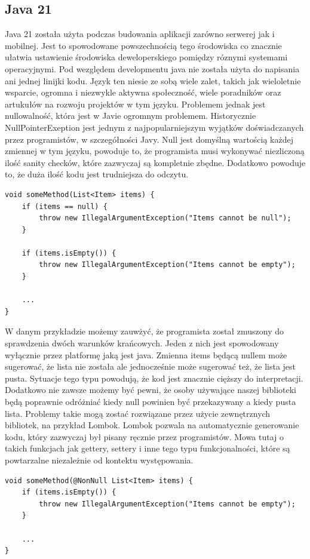 \subsection{Java 21}\label{subsec:uzyte-technologie-java}
Java 21 została użyta podczas budowania aplikacji zarówno serwerej jak i mobilnej.
Jest to spowodowane powszechnością tego środowiska co znacznie ułatwia ustawienie środowiska deweloperskiego pomiędzy róznymi systemami operacyjnymi.
Pod wezględem developmentu java nie została użyta do napisania ani jednej linijki kodu.
Język ten niesie ze sobą wiele zalet, takich jak wieloletnie wsparcie, ogromna i niezwykle aktywna społeczność, wiele poradników oraz artukułów na rozwoju projektów w tym języku.
Problemem jednak jest nullowalność, która jest w Javie ogromnym problemem.
Historycznie NullPointerExeption jest jednym z najpopularniejszym wyjątków doświadczanych przez programistów, w szczegółności Javy.
Null jest domyślną wartością każdej zmiennej w tym języku, powoduje to, że programista musi wykonywać niezliczoną ilość sanity checków, które zazwyczaj są kompletnie zbędne.
Dodatkowo powoduje to, że duża ilość kodu jest trudniejsza do odczytu.
\begin{lstlisting}[caption=Przykład obsługi null (Java)]
void someMethod(List<Item> items) {
    if (items == null) {
        throw new IllegalArgumentException("Items cannot be null");
    }

    if (items.isEmpty()) {
        throw new IllegalArgumentException("Items cannot be empty");
    }

    ...
}
\end{lstlisting}
W danym przykładzie możemy  zauwżyć, że programista został zmuszony do sprawdzenia dwóch warunków krańcowych.
Jeden z nich jest spowodowany wyłącznie przez platformę jaką jest java.
Zmienna items będącą nullem może sugerować, że lista nie została ale jednocześnie może sugerować też, że lista jest pusta.
Sytuacje tego typu powodują, że kod jest znacznie cięższy do interpretacji.
Dodatkowo nie zawsze możemy być pewni, że osoby używające naszej biblioteki będą poprawnie odróżniać kiedy null powinien być przekazywany a kiedy pusta lista.
Problemy takie mogą zostać rozwiązane przez użycie zewnętrznych bibliotek, na przykład Lombok.
Lombok pozwala na automatycznie generowanie kodu, który zazwyczaj był pisany ręcznie przez programistów.
Mowa tutaj o takich funkcjach jak gettery, settery i inne tego typu funkcjonalności, które są powtarzalne niezależnie od kontektu występowania.
\begin{lstlisting}[caption=Przykład obsługi null (Java z Lombok)]
void someMethod(@NonNull List<Item> items) {
    if (items.isEmpty()) {
        throw new IllegalArgumentException("Items cannot be empty");
    }

    ...
}
\end{lstlisting}
